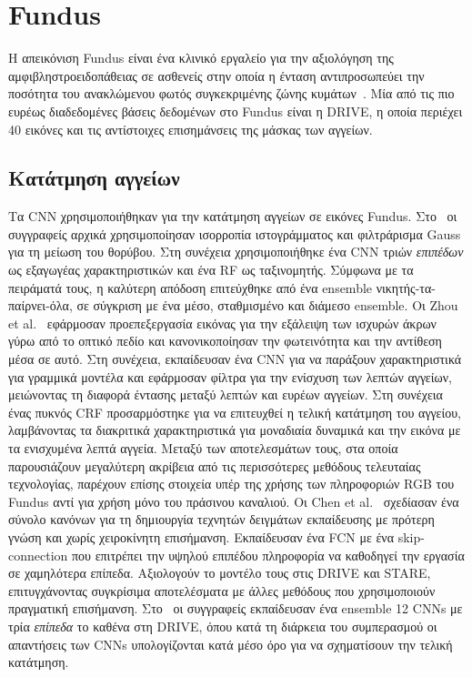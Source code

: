 \section{Fundus}
Η απεικόνιση Fundus είναι ένα κλινικό εργαλείο για την αξιολόγηση της αμφιβληστροειδοπάθειας σε ασθενείς στην οποία η ένταση αντιπροσωπεύει την ποσότητα του ανακλώμενου φωτός συγκεκριμένης ζώνης κυμάτων~\cite{abramoff2010retinal}.
Μία από τις πιο ευρέως διαδεδομένες βάσεις δεδομένων στο Fundus είναι η DRIVE, η οποία περιέχει 40 εικόνες και τις αντίστοιχες επισημάνσεις της μάσκας των αγγείων.

\subsection{Κατάτμηση αγγείων}
Τα CNN χρησιμοποιήθηκαν για την κατάτμηση αγγείων σε εικόνες Fundus.
Στο~\cite{wang2015hierarchical} οι συγγραφείς αρχικά χρησιμοποίησαν ισορροπία ιστογράμματος και φιλτράρισμα Gauss για τη μείωση του θορύβου.
Στη συνέχεια χρησιμοποιήθηκε ένα CNN τριών \textit{επιπέδων} ως εξαγωγέας χαρακτηριστικών και ένα RF ως ταξινομητής.
Σύμφωνα με τα πειράματά τους, η καλύτερη απόδοση επιτεύχθηκε από ένα ensemble νικητής-τα-παίρνει-όλα, σε σύγκριση με ένα μέσο, σταθμισμένο και διάμεσο ensemble.
Οι Zhou et al.~\cite{zhou2017improving} εφάρμοσαν προεπεξεργασία εικόνας για την εξάλειψη των ισχυρών άκρων γύρω από το οπτικό πεδίο και κανονικοποίησαν την φωτεινότητα και την αντίθεση μέσα σε αυτό.
Στη συνέχεια, εκπαίδευσαν ένα CNN για να παράξουν χαρακτηριστικά για γραμμικά μοντέλα και εφάρμοσαν φίλτρα για την ενίσχυση των λεπτών αγγείων, μειώνοντας τη διαφορά έντασης μεταξύ λεπτών και ευρέων αγγείων.
Στη συνέχεια ένας πυκνός CRF προσαρμόστηκε για να επιτευχθεί η τελική κατάτμηση του αγγείου, λαμβάνοντας τα διακριτικά χαρακτηριστικά για μοναδιαία δυναμικά και την εικόνα με τα ενισχυμένα λεπτά αγγεία.
Μεταξύ των αποτελεσμάτων τους, στα οποία παρουσιάζουν μεγαλύτερη ακρίβεια από τις περισσότερες μεθόδους τελευταίας τεχνολογίας, παρέχουν επίσης στοιχεία υπέρ της χρήσης των πληροφοριών RGB του Fundus αντί για χρήση μόνο του πράσινου καναλιού.
Οι Chen et al.~\cite{chen2017labeling} σχεδίασαν ένα σύνολο κανόνων για τη δημιουργία τεχνητών δειγμάτων εκπαίδευσης με πρότερη γνώση και χωρίς χειροκίνητη επισήμανση.
Εκπαίδευσαν ένα FCN με ένα skip-connection που επιτρέπει την υψηλού επιπέδου πληροφορία να καθοδηγεί την εργασία σε χαμηλότερα επίπεδα.
Αξιολογούν το μοντέλο τους στις DRIVE και STARE, επιτυγχάνοντας συγκρίσιμα αποτελέσματα με άλλες μεθόδους που χρησιμοποιούν πραγματική επισήμανση.
Στο~\cite{maji2016ensemble} οι συγγραφείς εκπαίδευσαν ένα ensemble 12 CNNs με τρία \textit{επίπεδα} το καθένα στη DRIVE, όπου κατά τη διάρκεια του συμπερασμού οι απαντήσεις των CNNs υπολογίζονται κατά μέσο όρο για να σχηματίσουν την τελική κατάτμηση.

